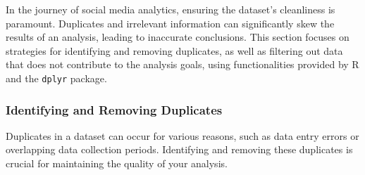 \documentclass[
]{book}
\begin{document}
In the journey of social media analytics, ensuring the dataset's cleanliness is paramount. Duplicates and irrelevant information can significantly skew the results of an analysis, leading to inaccurate conclusions. This section focuses on strategies for identifying and removing duplicates, as well as filtering out data that does not contribute to the analysis goals, using functionalities provided by R and the \texttt{dplyr} package.

\hypertarget{identifying-and-removing-duplicates}{%
\subsubsection{Identifying and Removing Duplicates}\label{identifying-and-removing-duplicates}}

Duplicates in a dataset can occur for various reasons, such as data entry errors or overlapping data collection periods. Identifying and removing these duplicates is crucial for maintaining the quality of your analysis.
\end{document}
